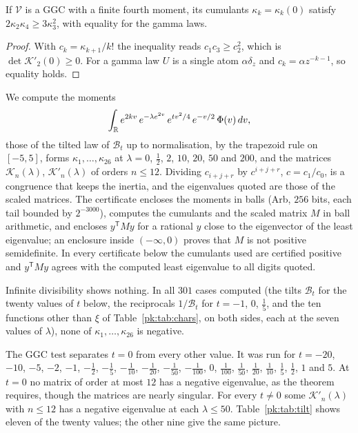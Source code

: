 \begin{lemma}\label{pk:lem:fourcum}
If $\mathcal V$ is a GGC with a finite fourth moment, its cumulants $\kappa_k=\kappa_k(0)$ satisfy $2\kappa_2\kappa_4\ge3\kappa_3^2$, with equality for the gamma laws.
\end{lemma}

\begin{proof}
With $c_k=\kappa_{k+1}/k!$ the inequality reads $c_1c_3\ge c_2^2$, which is $\det\mathcal K'_2(0)\ge0$. For a gamma law $U$ is a single atom $\alpha\delta_z$ and $c_k=\alpha z^{-k-1}$, so equality holds.
\end{proof}

We compute the moments
\[
\int_{\mathbb{R}}e^{2kv}\,e^{-\lambda e^{2v}}\,e^{tv^2/4}\,e^{-v/2}\,\Phi(v)\,dv,
\]
those of the tilted law of $\mathcal B_t$ up to normalisation, by the trapezoid rule on $[-5,5]$, forms $\kappa_1,\dots,\kappa_{26}$ at $\lambda=0$, $\frac12$, $2$, $10$, $20$, $50$ and $200$, and the matrices $\mathcal K_n(\lambda)$, $\mathcal K'_n(\lambda)$ of orders $n\le12$. Dividing $c_{i+j+r}$ by $c^{i+j+r}$, $c=c_1/c_0$, is a congruence that keeps the inertia, and the eigenvalues quoted are those of the scaled matrices. The certificate encloses the moments in balls (Arb, $256$ bits, each tail bounded by $2^{-3000}$), computes the cumulants and the scaled matrix $M$ in ball arithmetic, and encloses $y^{\mathsf T}My$ for a rational $y$ close to the eigenvector of the least eigenvalue; an enclosure inside $(-\infty,0)$ proves that $M$ is not positive semidefinite. In every certificate below the cumulants used are certified positive and $y^{\mathsf T}My$ agrees with the computed least eigenvalue to all digits quoted.

Infinite divisibility shows nothing. In all $301$ cases computed (the tilts $\mathcal B_t$ for the twenty values of $t$ below, the reciprocals $1/\mathcal B_t$ for $t=-1$, $0$, $\frac15$, and the ten functions other than $\xi$ of Table~\ref{pk:tab:chars}, on both sides, each at the seven values of $\lambda$), none of $\kappa_1,\dots,\kappa_{26}$ is negative.

The GGC test separates $t=0$ from every other value. It was run for $t=-20$, $-10$, $-5$, $-2$, $-1$, $-\frac12$, $-\frac15$, $-\frac1{10}$, $-\frac1{20}$, $-\frac1{50}$, $-\frac1{100}$, $0$, $\frac1{100}$, $\frac1{50}$, $\frac1{20}$, $\frac1{10}$, $\frac15$, $\frac12$, $1$ and $5$. At $t=0$ no matrix of order at most $12$ has a negative eigenvalue, as the theorem requires, though the matrices are nearly singular. For every $t\ne0$ some $\mathcal K'_n(\lambda)$ with $n\le12$ has a negative eigenvalue at each $\lambda\le50$. Table~\ref{pk:tab:tilt} shows eleven of the twenty values; the other nine give the same picture.

